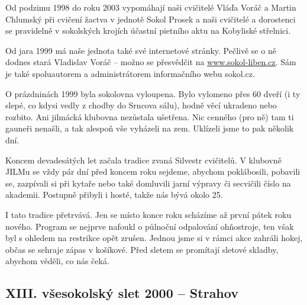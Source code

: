 Od podzimu 1998 do roku 2003 vypomáhají naši cvičitelé Vláďa Voráč a
Martin Chlumský při cvičení žactva v jednotě Sokol Prosek a naši
cvičitelé a dorostenci se pravidelně v sokolských krojích účastní
pietního aktu na Kobyliské střelnici.

Od jara 1999 má naše jednota také své internetové stránky. Pečlivě se o
ně dodnes stará Vladislav Voráč -- možno se přesvědčit na
\href{http://www.sokol-liben.cz/}{\ul{www.sokol-liben.cz}}. Sám je také
spoluautorem a administrátorem informačního webu sokol.cz.

O prázdninách 1999 byla sokolovna vyloupena. Bylo vylomeno přes 60 dveří
(i ty slepé, co kdysi vedly z chodby do Srncova sálu), hodně věcí
ukradeno nebo rozbito. Ani jilmácká klubovna nezůstala ušetřena. Nic
cenného (pro ně) tam ti gauneři nenašli, a tak alespoň vše vyházeli na
zem. Uklízeli jsme to pak několik dní.

Koncem devadesátých let začala tradice zvaná Silvestr cvičitelů. V
klubovně JILMu se vždy pár dní před koncem roku sejdeme, abychom
poklábosili, pobavili se, zazpívali si při kytaře nebo také domluvili
jarní výpravy či secvičili číslo na akademii. Postupně přibyli i hosté,
takže nás bývá okolo 25.

I tato tradice přetrvává. Jen se místo konce roku scházíme až první
pátek roku nového. Program se nejprve nafoukl o půlnoční odpalování
ohňostroje, ten však byl s ohledem na restrikce opět zrušen. Jednou jsme
si v rámci akce zahráli hokej, občas se sehraje zápas v košíkové. Před
sletem se promítají sletové skladby, abychom věděli, co nás čeká.

\subsection{XIII. všesokolský slet 2000 --
Strahov}\label{xiii.-vux161esokolskuxfd-slet-2000-strahov}

